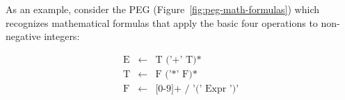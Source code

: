 \begin{example}
   As an example, consider the PEG (Figure~\ref{fig:peg-math-formulas}) which
   recognizes mathematical formulas that apply the basic four operations to
   non-negative integers:

   \begin{figure*}[ht]
      \[
         \begin{array}{lcl}
            \text{E}   & \leftarrow & \text{T ('+' T)*} \\
            \text{T}  & \leftarrow & \text{F ('*' F)*} \\
            \text{F} & \leftarrow & \text{[0-9]+ / '(' Expr ')'} \\
         \end{array}
      \]
      \centering
      \caption{PEG for mathematical formulas.}
      \label{fig:peg-math-formulas}
   \end{figure*}


\end{example}
